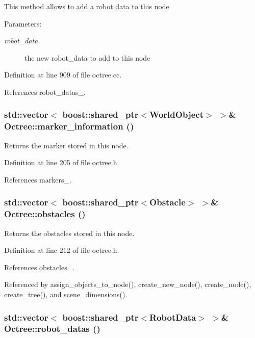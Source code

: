 This method allows to add a robot data to this node

\begin{Desc}
\item[Parameters:]
\begin{description}
\item[{\em robot\_\-data}]the new robot\_\-data to add to this node \end{description}
\end{Desc}


Definition at line 909 of file octree.cc.

References robot\_\-datas\_\-.\hypertarget{class_octree_b87eff58fb428441817a569e4674a414}{
\subsubsection[marker\_\-information]{\setlength{\rightskip}{0pt plus 5cm}std::vector$<$ boost::shared\_\-ptr$<${\bf WorldObject}$>$ $>$\& Octree::marker\_\-information ()}}
\label{class_octree_b87eff58fb428441817a569e4674a414}


Returns the marker stored in this node. 

Definition at line 205 of file octree.h.

References markers\_\-.\hypertarget{class_octree_0f5d4b3c958b35605eb5f8ed808dc021}{
\subsubsection[obstacles]{\setlength{\rightskip}{0pt plus 5cm}std::vector$<$ boost::shared\_\-ptr$<$Obstacle$>$ $>$\& Octree::obstacles ()}}
\label{class_octree_0f5d4b3c958b35605eb5f8ed808dc021}


Returns the obstacles stored in this node. 

Definition at line 212 of file octree.h.

References obstacles\_\-.

Referenced by assign\_\-objects\_\-to\_\-node(), create\_\-new\_\-node(), create\_\-node(), create\_\-tree(), and scene\_\-dimensions().\hypertarget{class_octree_daef5372a7ebc7e42cc7f3004b68c1ed}{
\subsubsection[robot\_\-datas]{\setlength{\rightskip}{0pt plus 5cm}std::vector$<$ boost::shared\_\-ptr$<${\bf RobotData}$>$ $>$\& Octree::robot\_\-datas ()}}
\label{class_octree_daef5372a7ebc7e42cc7f3004b68c1ed}


